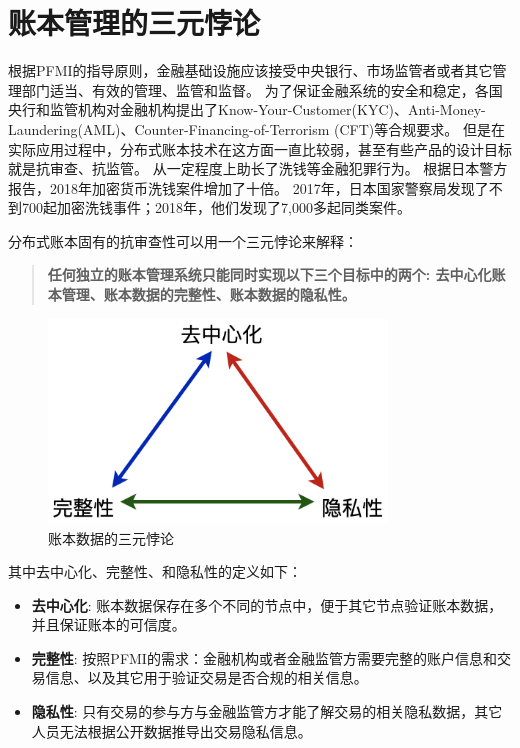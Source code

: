 \section{账本管理的三元悖论}\label{sec:triangle}
根据PFMI的指导原则，金融基础设施应该接受中央银行、市场监管者或者其它管理部门适当、有效的管理、监管和监督。
为了保证金融系统的安全和稳定，各国央行和监管机构对金融机构提出了Know-Your-Customer(KYC)、Anti-Money-Laundering(AML)、Counter-Financing-of-Terrorism (CFT)等合规要求。
但是在实际应用过程中，分布式账本技术在这方面一直比较弱，甚至有些产品的设计目标就是抗审查、抗监管。
从一定程度上助长了洗钱等金融犯罪行为。
根据日本警方报告\cite{jp_report}，2018年加密货币洗钱案件增加了十倍。
2017年，日本国家警察局发现了不到700起加密洗钱事件；2018年，他们发现了7,000多起同类案件。

分布式账本固有的抗审查性可以用一个三元悖论来解释：

\begin{quotation}
    \textbf{任何独立的账本管理系统只能同时实现以下三个目标中的两个: 去中心化账本管理、账本数据的完整性、账本数据的隐私性。}
\end{quotation}

\begin{figure}[h!]
    \centering
    \includegraphics[width=9cm, keepaspectratio]{images/triangle.png}
    \caption{账本数据的三元悖论}
    \label{fig:triangle}
\end{figure}


其中去中心化、完整性、和隐私性的定义如下：
\begin{itemize}
    \item[\dag] \textbf{去中心化}:
    账本数据保存在多个不同的节点中，便于其它节点验证账本数据，并且保证账本的可信度。

    \item[\dag] \textbf{完整性}:
    按照PFMI的需求：金融机构或者金融监管方需要完整的账户信息和交易信息、以及其它用于验证交易是否合规的相关信息。
    
    \item[\dag] \textbf{隐私性}:
    只有交易的参与方与金融监管方才能了解交易的相关隐私数据，其它人员无法根据公开数据推导出交易隐私信息。
\end{itemize}

